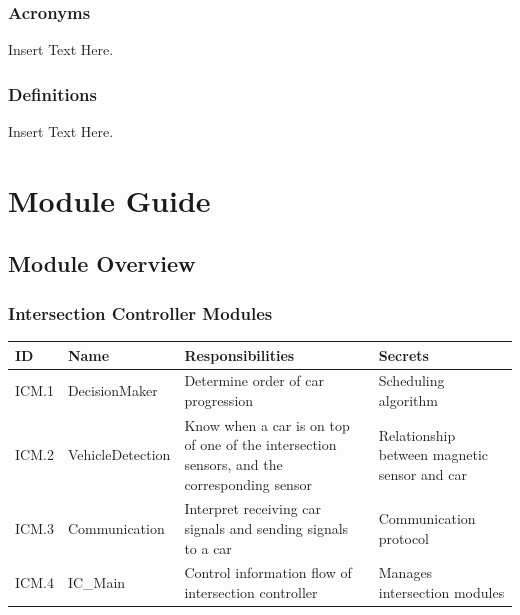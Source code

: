 \documentclass [10pt]{article}
\begin{document}
\subsubsection{Acronyms}
Insert Text Here. 

\subsubsection{Definitions}
Insert Text Here. 

\section{Module Guide}

\subsection{Module Overview}

\subsubsection{Intersection Controller Modules}

\begin{longtable}{ |p{ }  | p{ } |  p{ } |  p{ } |}  \hline
    
    \textbf{ID} & \textbf{Name} &  \textbf{Responsibilities} & \textbf{Secrets} \\ \hline
    
    \cellcolor{tableCell}ICM.1  & \cellcolor{tableCell}DecisionMaker & \cellcolor{tableCell}Determine order of car progression & \cellcolor{tableCell} Scheduling algorithm \\ \hline
    
    ICM.2 & VehicleDetection & Know when a car is on top of one of the intersection sensors, and the corresponding sensor & Relationship between magnetic sensor and car \\ \hline
    
    \cellcolor{tableCell}ICM.3  & \cellcolor{tableCell}Communication & \cellcolor{tableCell}Interpret receiving car signals and sending signals to a car & \cellcolor{tableCell}Communication protocol \\ \hline
    
    
        ICM.4 & IC\_Main & Control information flow of intersection controller & Manages intersection modules \\ \hline

\end{longtable}
\end{document}
